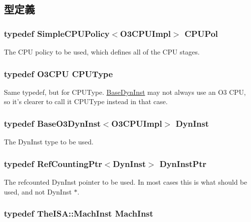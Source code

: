 \subsection{型定義}
\hypertarget{structO3CPUImpl_aeba254ee40fcbe18afbc0d55cb4df61e}{
\subsubsection[{CPUPol}]{\setlength{\rightskip}{0pt plus 5cm}typedef {\bf SimpleCPUPolicy}$<${\bf O3CPUImpl}$>$ {\bf CPUPol}}}
\label{structO3CPUImpl_aeba254ee40fcbe18afbc0d55cb4df61e}
The CPU policy to be used, which defines all of the CPU stages. \hypertarget{structO3CPUImpl_a3ba7f2725c642bed7818c4cef75aa9f2}{
\subsubsection[{CPUType}]{\setlength{\rightskip}{0pt plus 5cm}typedef {\bf O3CPU} {\bf CPUType}}}
\label{structO3CPUImpl_a3ba7f2725c642bed7818c4cef75aa9f2}
Same typedef, but for CPUType. \hyperlink{classBaseDynInst}{BaseDynInst} may not always use an O3 CPU, so it's clearer to call it CPUType instead in that case. \hypertarget{structO3CPUImpl_a2b06f471018e9b0b8e4b3785af475b2d}{
\subsubsection[{DynInst}]{\setlength{\rightskip}{0pt plus 5cm}typedef {\bf BaseO3DynInst}$<${\bf O3CPUImpl}$>$ {\bf DynInst}}}
\label{structO3CPUImpl_a2b06f471018e9b0b8e4b3785af475b2d}
The DynInst type to be used. \hypertarget{structO3CPUImpl_a97c1adaf6da40f1dd1f86fe0b3b51249}{
\subsubsection[{DynInstPtr}]{\setlength{\rightskip}{0pt plus 5cm}typedef {\bf RefCountingPtr}$<${\bf DynInst}$>$ {\bf DynInstPtr}}}
\label{structO3CPUImpl_a97c1adaf6da40f1dd1f86fe0b3b51249}
The refcounted DynInst pointer to be used. In most cases this is what should be used, and not DynInst $\ast$. \hypertarget{structO3CPUImpl_a4617f528417b8f55f809ae0988284c9b}{
\subsubsection[{MachInst}]{\setlength{\rightskip}{0pt plus 5cm}typedef TheISA::MachInst {\bf MachInst}}}
